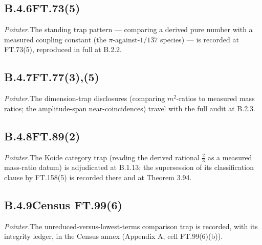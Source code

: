 \documentclass[11pt,openany]{report}
\theoremstyle{canonplain}
\theoremstyle{canondef}
\begin{document}
\subsection*{\texorpdfstring{B.4.6\quad FT.73(5)}{FT.73(5) B.4.6}}
{\small \textit{Pointer.}\quad The standing trap pattern — comparing a derived pure number with a measured coupling constant (the $\pi$-against-$1/137$ species) — is recorded at FT.73(5), reproduced in full at B.2.2.}
\medskip
\subsection*{\texorpdfstring{B.4.7\quad FT.77(3),(5)}{FT.77(3),(5) B.4.7}}
{\small \textit{Pointer.}\quad The dimension-trap disclosures (comparing $m^2$-ratios to measured mass ratios; the amplitude-span near-coincidences) travel with the full audit at B.2.3.}
\medskip
\subsection*{\texorpdfstring{B.4.8\quad FT.89(2)}{FT.89(2) B.4.8}}
{\small \textit{Pointer.}\quad The Koide category trap (reading the derived rational $\tfrac23$ as a measured mass-ratio datum) is adjudicated at B.1.13; the supersession of its classification clause by FT.158(5) is recorded there and at Theorem 3.94.}
\medskip
\subsection*{\texorpdfstring{B.4.9\quad Census FT.99(6)}{Census FT.99(6) B.4.9}}
{\small \textit{Pointer.}\quad The unreduced-versus-lowest-terms comparison trap is recorded, with its integrity ledger, in the Census annex (Appendix A, cell FT.99(6)(b)).}
\medskip
\end{document}
